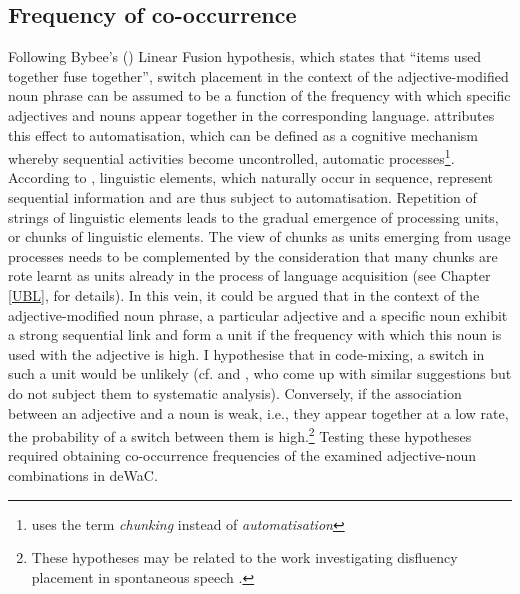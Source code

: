 \subsection{Frequency of co-occurrence}
Following Bybee's (\citeyear[112]{bybee-constituency-2002}) Linear Fusion hypothesis, which states that ``items used together fuse together'', switch placement in the context of the adjective-modified noun phrase can be assumed to be a function of the frequency with which specific adjectives and nouns appear together in the corresponding language. \citet{diessel-toappear} attributes this effect to automatisation, which can be defined as a cognitive mechanism whereby sequential activities become uncontrolled, automatic processes\footnote{\citet{bybee-book-2010} uses the term \textit{chunking} instead of \textit{automatisation}}. According to \citet{diessel-toappear}, linguistic elements, which naturally occur in sequence, represent sequential information and are thus subject to automatisation. Repetition of strings of linguistic elements leads to the gradual emergence of processing units, or chunks of linguistic elements.  The view of chunks as units emerging from usage processes needs to be complemented by the consideration that many chunks are rote learnt as units already in the process of language acquisition (see Chapter \ref{UBL}, for details). In this vein, it could be argued that in the context of the adjective-modified noun phrase, a particular adjective and a specific noun exhibit a strong sequential link and form a unit if the frequency with which this noun is used with the adjective is high. I hypothesise that in code-mixing, a switch in such a unit would be unlikely (cf. \citealt[125--131]{backus-two-1996} and \citealt[386]{boumans-syntax-1998}, who come up with similar suggestions but do not subject them to systematic analysis). Conversely, if the association between an adjective and a noun is weak, i.e., they appear together at a low rate, the probability of a switch between them is high.\footnote{These hypotheses may be related to the work investigating disfluency placement in spontaneous speech \citep[e.g.,][]{schneider2014}.} Testing these hypotheses required obtaining co-occurrence frequencies of the examined adjective-noun combinations in deWaC. 


